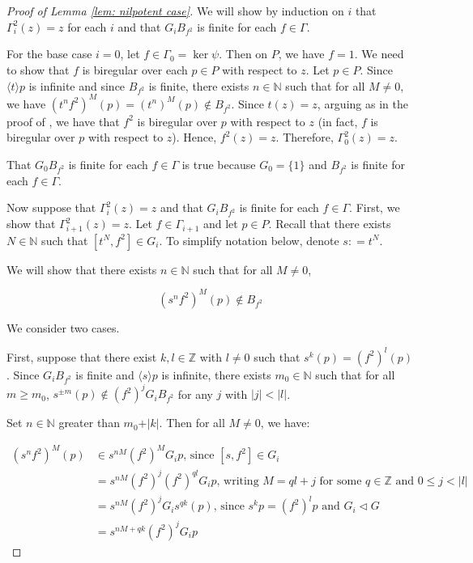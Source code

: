 \documentclass[12pt]{article}
\newcommand{\vs}{\vskip10pt}
\theoremstyle{definition}
\newcommand{\N}{\mathbb{N}}
\newcommand{\Z}{\mathbb{Z}}
\begin{document}
\begin{proof}[Proof of Lemma \ref{lem: nilpotent case}]
    We will show by induction on $i$ that $\Gamma_i^2(z) = z$ for each $i$ and that $G_i B_{f^2}$ is finite for each $f \in \Gamma$. 

    For the base case $i = 0$, let $f \in \Gamma_0 = \ker \psi$. Then on $P$, we have $f = 1$. We need to show that $f$ is biregular over each $p \in P$ with respect to $z$. Let $p \in P$. Since $\langle t \rangle p$ is infinite and since $B_{f^2}$ is finite, there exists $n \in \N$ such that for all $M \neq 0$, we have $(t^nf^2)^M(p) = (t^n)^M (p) \notin B_{f^2}$. Since $t(z) = z$, arguing as in the proof of \cite[Lemma 4.7]{Algebraic}, we have that $f^2$ is biregular over $p$ with respect to $z$ (in fact, $f$ is biregular over $p$ with respect to $z$). Hence, $f^2(z) = z$. Therefore, $\Gamma_0^2 (z) = z$. 

    That $G_0 B_{f^2}$ is finite for each $f \in \Gamma$ is true because $G_0 = \{1\}$ and $B_{f^2}$ is finite for each $f \in \Gamma$. 

   Now suppose that $\Gamma_i^2(z) = z$ and that $G_iB_{f^2}$ is finite for each $f \in \Gamma$. First, we show that $\Gamma_{i+1}^2(z) = z$.  Let $f \in \Gamma_{i+1}$ and let $p \in P$. Recall that there exists $N \in \N$ such that $[t^N,f^2] \in G_i$. To simplify notation below, denote $s: =t^N$. 

   We will show that there exists $n \in \N$ such that for all $M \neq 0$, 

    $$(s^n f^2)^M (p) \notin B_{f^2}$$

    We consider two cases. 
    
    \vs
    
    First, suppose that there exist $k, l \in \Z$ with $l \neq 0$ such that $s^k (p) = (f^2)^{l}(p)$. Since $G_iB_{f^2}$ is finite and $\langle s \rangle p$ is infinite, there exists $m_0 \in \N$ such that for all $m \geq m_0$, $s^{\pm m} (p) \notin (f^2)^j G_i B_{f^2}$ for any $j$ with $\vert j \vert < \vert l\vert$. 

    Set $n \in \N$ greater than $m_0 + \vert k \vert$. Then for all $M \neq 0$, we have: 

    \begin{align*}
        (s^n f^2)^M (p) &\in s^{nM} (f^2)^{M} G_i p \text{, since $[s, f^2] \in G_i$} \\
        &= s^{nM} (f^2)^j (f^2)^{ql} G_i p \text{, writing } M = ql + j \text{ for some $q \in \Z$ and $0 \leq j < \vert l \vert$} \\
        &= s^{nM} (f^2)^j G_i s^{qk}(p) \text{, since $s^k p = (f^2)^l p$ and $G_i \triangleleft G$}\\
        &= s^{nM+qk} (f^2)^j G_i p
    \end{align*}


\end{proof}
\end{document}
